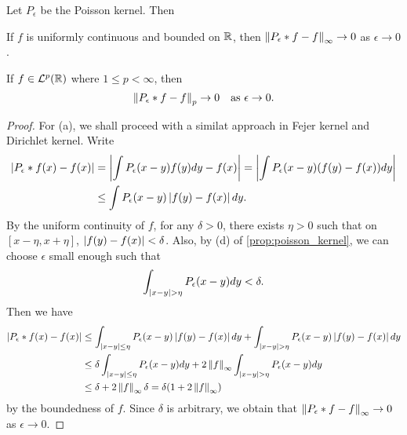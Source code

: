 \begin{lemma}\label{lem:poisson_kernel}
    Let $P_\epsilon$ be the Poisson kernel. Then 
    \begin{thmenum}
        \item If $f$ is uniformly continuous and bounded on $\mathbb{R}$, then 
        $\left\lVert {P_\epsilon*f - f} \right\rVert_\infty \to 0$ as $\epsilon\to 0$.
        \item If $f\in\mathcal{L}^p(\mathbb{R})$ where $1\leq p<\infty$, then
        \begin{equation*}
            \left\lVert {P_\epsilon*f - f} \right\rVert_p \to 0\quad\text{as }\epsilon\to 0.
        \end{equation*}
    \end{thmenum}
\end{lemma}
\begin{proof}
    For (a), we shall proceed with a similat approach in Fejer kernel and 
    Dirichlet kernel. Write 
    \begin{equation*}
        \begin{split}
            \abs{P_\epsilon*f(x) - f(x)} 
            &= \abs{\int P_\epsilon(x-y)f(y)dy - f(x)} = \abs{\int P_\epsilon(x-y)\pth{f(y) - f(x)}dy} \\
            &\leq \int P_\epsilon(x-y)\abs{f(y) - f(x)}dy.
        \end{split}
    \end{equation*}
    By the uniform continuity of $f$, for any $\delta>0$, there exists $\eta>0$ such that 
    on $[x-\eta,x+\eta]$, $\left\lvert {f(y) - f(x)} \right\rvert<\delta$. Also, by (d) of 
    \cref{prop:poisson_kernel}, we can choose $\epsilon$ small enough such that 
    \begin{equation*}
        \int_{\left\lvert {x-y} \right\rvert>\eta}P_\epsilon(x-y)dy < \delta.
    \end{equation*}
    Then we have
    \begin{equation*}
        \begin{split}
            \left\lvert {P_\epsilon*f(x) - f(x)} \right\rvert 
            &\leq \int_{\left\lvert {x-y} \right\rvert\leq\eta}P_\epsilon(x-y)\left\lvert {f(y) - f(x)} \right\rvert dy + \int_{\left\lvert {x-y} \right\rvert>\eta}P_\epsilon(x-y)\left\lvert {f(y) - f(x)} \right\rvert dy \\
            &\leq \delta\int_{\left\lvert {x-y} \right\rvert\leq\eta}P_\epsilon(x-y)dy + 2\left\lVert {f} \right\rVert_\infty\int_{\left\lvert {x-y} \right\rvert>\eta}P_\epsilon(x-y)dy \\
            &\leq \delta + 2\left\lVert {f} \right\rVert_\infty\delta = \delta(1 + 2\left\lVert {f} \right\rVert_\infty)
        \end{split}
    \end{equation*}
    by the boundedness of $f$. Since $\delta$ is arbitrary, we obtain that 
    $\left\lVert {P_\epsilon*f - f} \right\rVert_\infty\to 0$ as $\epsilon\to 0$.


\end{proof}
